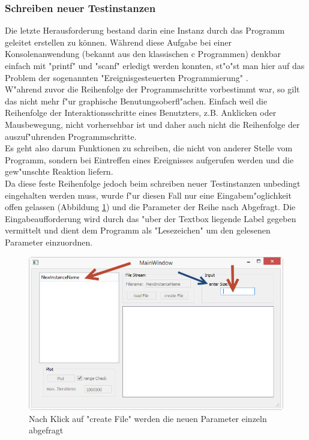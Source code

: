 \documentclass[11pt, a4paper, german]{article}
\theoremstyle{plain}
\begin{document}
	\subsubsection{Schreiben neuer Testinstanzen}
	Die letzte Herausforderung bestand darin eine Instanz durch das Programm geleitet erstellen zu können. Während diese Aufgabe bei einer Konsolenanwendung (bekannt aus den klassischen c Programmen) denkbar einfach mit "{}printf"{} und "{}scanf"{} erledigt werden konnten, st"o"st man hier auf das Problem der sogenannten "{}Ereignisgesteuerten Programmierung"{} \cite{breymann2011c++}.\\
	W"ahrend zuvor die Reihenfolge der Programmschritte vorbestimmt war, so gilt das nicht mehr f"ur graphische Benutungsoberfl"achen. Einfach weil die Reihenfolge der Interaktionsschritte eines Benutzters, z.B. Anklicken oder Mausbewegung, nicht vorhersehbar ist und daher auch nicht die Reihenfolge der auszuf"uhrenden Programmschritte.\\
	Es geht also darum Funktionen zu schreiben, die nicht von anderer Stelle vom Programm, sondern bei Eintreffen eines Ereignisses aufgerufen werden und die gew"unschte Reaktion liefern.\\
	Da diese feste Reihenfolge jedoch beim schreiben neuer Testinstanzen unbedingt eingehalten werden muss, wurde f"ur diesen Fall nur eine Eingabem"oglichkeit offen gelassen (Abbildung \ref{fig:MainWindow_createFile}) und die Parameter der Reihe nach Abgefragt. Die Eingabeaufforderung wird durch das "uber der Textbox liegende Label gegeben vermittelt und dient dem Programm als "{}Lesezeichen"{} um den gelesenen Parameter einzuordnen.\\
	\begin{figure}[H]
		\centering
		\includegraphics[width=1\linewidth]{./Pictures/MainWindow_createFile}
		\caption[erstelle Datei]{Nach Klick auf "{}create File"{} werden die neuen Parameter einzeln abgefragt}
		\label{fig:MainWindow_createFile}
	\end{figure}
	
\end{document}
